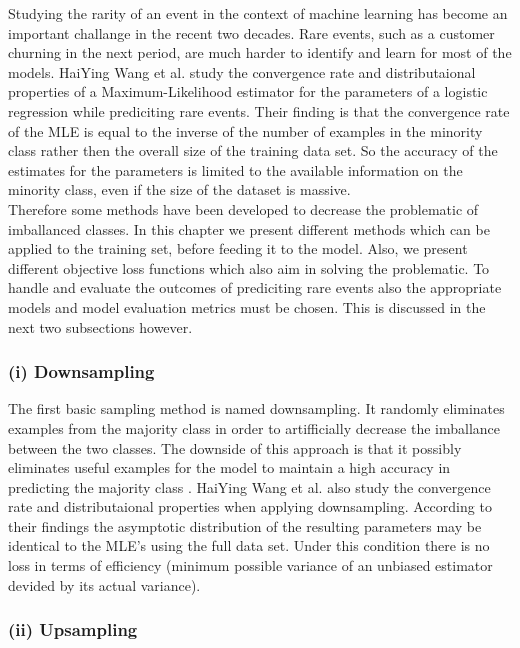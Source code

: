\documentclass[12pt,titlepage]{article}
\begin{document}
Studying the rarity of an event in the context of machine learning has become an important challange in the recent two decades. Rare events, such as a customer churning in the next period, are much harder to identify and learn for most of the models. HaiYing Wang et al. \cite{convergence_rareevents} study the convergence rate and distributaional properties of a Maximum-Likelihood estimator for the parameters of a logistic regression while prediciting rare events. Their finding is that the convergence rate of the MLE is equal to the inverse of the number of examples in the minority class rather then the overall size of the training data set. So the accuracy of the estimates for the parameters is limited to the available information on the minority class, even if the size of the dataset is massive. \\
Therefore some methods have been developed to decrease the problematic of imballanced classes. In this chapter we present different methods which can be applied to the training set, before feeding it to the model. Also, we present different objective loss functions which also aim in solving the problematic. To handle and evaluate the outcomes
of prediciting rare events also the appropriate models and model evaluation metrics must be chosen. This is discussed in the next two subsections however. \\

\subsubsection*{(i) Downsampling}

The first basic sampling method is named downsampling. It randomly eliminates examples from the majority class in order to artifficially decrease the imballance between the two classes. The downside of this approach is that it possibly eliminates useful examples for the model to maintain a high accuracy in predicting the majority class \cite{mining_rarity}. HaiYing Wang et al. also study the convergence rate and distributaional properties when applying downsampling. According to their findings the asymptotic distribution of the resulting parameters may be identical to the MLE's using the full data set. Under this condition there is no loss in terms of efficiency (minimum possible variance of an unbiased estimator devided by its actual variance). \\

\subsubsection*{(ii) Upsampling}
\end{document}
